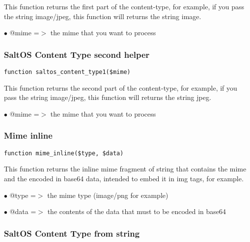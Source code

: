 \documentclass[a4paper]{article}
\begin{document}
This function returns the first part of the content-type, for example, if you
pass the string image/jpeg, this function will returns the string image.

\begin{compactitem}
\item[\color{myblue}$\bullet$] @mime =$>$ the mime that you want to process
\end{compactitem}

\hypertarget{toc177}{}
\subsubsection{SaltOS Content Type second helper}

\begin{lstlisting}
function saltos_content_type1($mime)
\end{lstlisting}

This function returns the second part of the content-type, for example, if you
pass the string image/jpeg, this function will returns the string jpeg.

\begin{compactitem}
\item[\color{myblue}$\bullet$] @mime =$>$ the mime that you want to process
\end{compactitem}

\hypertarget{toc178}{}
\subsubsection{Mime inline}

\begin{lstlisting}
function mime_inline($type, $data)
\end{lstlisting}

This function returns the inline mime fragment of string that contains the mime
and the encoded in base64 data, intended to embed it in img tags, for example.

\begin{compactitem}
\item[\color{myblue}$\bullet$] @type =$>$ the mime type (image/png for example)
\item[\color{myblue}$\bullet$] @data =$>$ the contents of the data that must to be encoded in base64
\end{compactitem}

\hypertarget{toc179}{}
\subsubsection{SaltOS Content Type from string}
\end{document}
